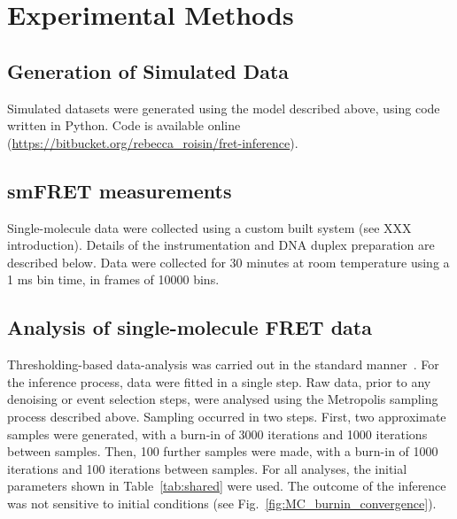 \section{Experimental Methods}
\subsection*{Generation of Simulated Data}
Simulated datasets were generated using the model described above, using code written in Python. Code is available online (\url{https://bitbucket.org/rebecca_roisin/fret-inference}). 

\subsection*{smFRET measurements}
Single-molecule data were collected using a custom built system (see XXX introduction). Details of the instrumentation and DNA duplex preparation are described below. Data were collected for 30 minutes at room temperature using a 1 ms bin time, in frames of 10000 bins.

\subsection*{Analysis of single-molecule FRET data}
Thresholding-based data-analysis was carried out in the standard manner~\cite{deniz01}.  For the inference process, data were fitted in a single step. Raw data, prior to any denoising or event selection steps, were analysed using the Metropolis sampling process described above. Sampling occurred in two steps. First, two approximate samples were generated, with a burn-in of 3000 iterations and 1000 iterations between samples. Then, 100 further samples were made, with a burn-in of 1000 iterations and 100 iterations between samples. For all analyses, the initial parameters shown in Table~\ref{tab:shared} were used. The outcome of the inference was not sensitive to initial conditions (see Fig.~\ref{fig:MC_burnin_convergence}).  

